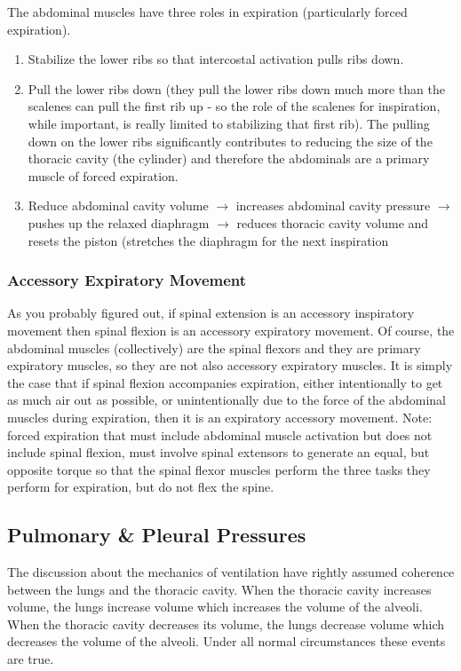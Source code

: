 The abdominal muscles have three roles in expiration (particularly forced expiration).

\begin{enumerate}
\item Stabilize the lower ribs so that intercostal activation pulls ribs down.
\item Pull the lower ribs down (they pull the lower ribs down much more than the scalenes can pull the first rib up - so the role of the scalenes for inspiration, while important, is really limited to stabilizing that first rib). The pulling down on the lower ribs significantly contributes to reducing the size of the thoracic cavity (the cylinder) and therefore the abdominals are a primary muscle of forced expiration.
\item Reduce abdominal cavity volume $\rightarrow$ increases abdominal cavity pressure $\rightarrow$ pushes up the relaxed diaphragm $\rightarrow$ reduces thoracic cavity volume and resets the piston (stretches the diaphragm for the next inspiration
\end{enumerate}

\subsubsection{Accessory Expiratory Movement}

As you probably figured out, if spinal extension is an accessory inspiratory movement then spinal flexion is an accessory expiratory movement. Of course, the abdominal muscles (collectively) are the spinal flexors and they are primary expiratory muscles, so they are not also accessory expiratory muscles. It is simply the case that if spinal flexion accompanies expiration, either intentionally to get as much air out as possible, or unintentionally due to the force of the abdominal muscles during expiration, then it is an expiratory accessory movement. Note: forced expiration that must include abdominal muscle activation but does not include spinal flexion, must involve spinal extensors to generate an equal, but opposite torque so that the spinal flexor muscles perform the three tasks they perform for expiration, but do not flex the spine.

\subsection{Pulmonary \& Pleural Pressures}
The discussion about the mechanics of ventilation have rightly assumed coherence between the lungs and the thoracic cavity. When the thoracic cavity increases volume, the lungs increase volume which increases the volume of the alveoli. When the thoracic cavity decreases its volume, the lungs decrease volume which decreases the volume of the alveoli. Under all normal circumstances these events are true. 

